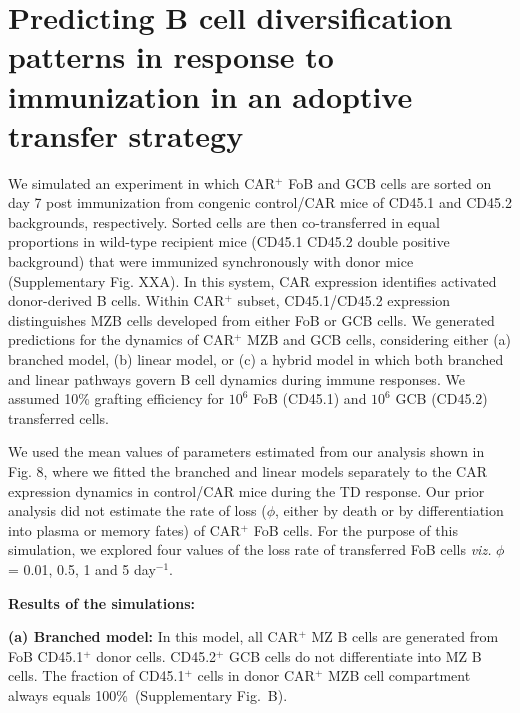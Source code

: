 \documentclass[11pt]{article}
\newcommand{\red}[1]{{\color{red}{#1}}}
\begin{document}
\section*{Predicting B cell diversification patterns in response to immunization in an adoptive transfer strategy}
We simulated an experiment in which CAR$^{+}$ FoB and GCB cells are sorted on day 7 post immunization from congenic control/CAR mice of CD45.1 and CD45.2 backgrounds, respectively. 
Sorted cells are then co-transferred in equal proportions in wild-type recipient mice (CD45.1 CD45.2 double positive background) that were immunized synchronously with donor mice (Supplementary Fig. XXA). 
In this system, CAR expression identifies activated donor-derived B cells. Within CAR$^{+}$ subset, CD45.1/CD45.2 expression distinguishes MZB cells developed from either FoB or GCB cells.
We generated predictions for the dynamics of CAR$^{+}$  MZB and GCB cells, considering either (a) branched model, (b) linear model, or (c) a hybrid model in which both branched and linear pathways govern B cell dynamics during immune responses. 
We assumed 10\% grafting efficiency for $10^{6}$ FoB (CD45.1) and $10^{6}$ GCB (CD45.2) transferred cells. 

We used the mean values of parameters estimated from our analysis shown in Fig. 8, where we fitted the branched and linear models separately to the CAR expression dynamics in control/CAR mice during the TD response.
Our prior analysis did not estimate the rate of loss ($\phi$, either by death or by differentiation into plasma or memory fates) of CAR$^{+}$ FoB cells.
For the purpose of this simulation, we explored four values of the loss rate of transferred FoB cells \textit{viz.} $\phi$ = 0.01, 0.5, 1 and 5 day$^{-1}$.

\textbf{Results of the simulations:}

\textbf{(a) Branched model:}
In this model, all CAR$^{+}$  MZ B cells are generated from FoB CD45.1$^{+}$ donor cells.
CD45.2$^{+}$ GCB cells do not differentiate into MZ B cells.
The fraction of CD45.1$^{+}$ cells in donor CAR$^{+}$ MZB cell compartment always equals 100\%~(Supplementary Fig.~\red{XX}B).
\end{document}
